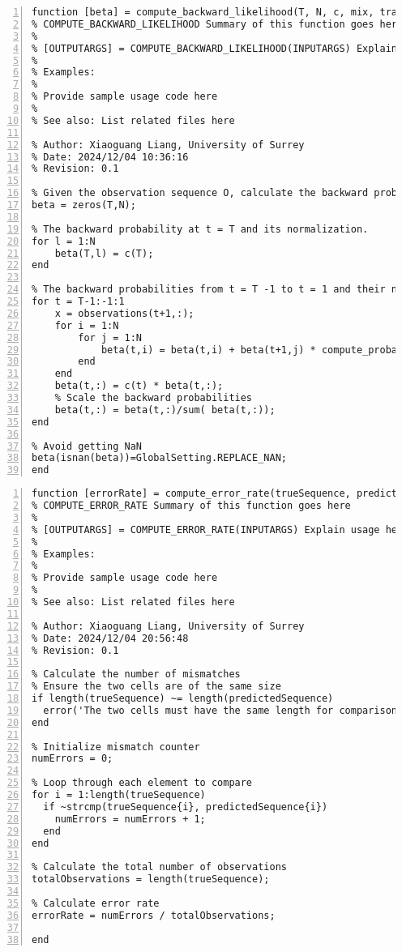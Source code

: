 \documentclass{article}
\begin{document}
\begin{lstlisting}[frame=single, numbers=left, style=Matlab-editor, caption={compute\_backward\_likelihood.m}, label={lst:compute_backward_likelihood}]
  function [beta] = compute_backward_likelihood(T, N, c, mix, trans, observations)
% COMPUTE_BACKWARD_LIKELIHOOD Summary of this function goes here
% 
% [OUTPUTARGS] = COMPUTE_BACKWARD_LIKELIHOOD(INPUTARGS) Explain usage here
% 
% Examples: 
% 
% Provide sample usage code here
% 
% See also: List related files here

% Author: Xiaoguang Liang, University of Surrey 
% Date: 2024/12/04 10:36:16 
% Revision: 0.1 

% Given the observation sequence O, calculate the backward probabilities beta.
beta = zeros(T,N);

% The backward probability at t = T and its normalization.
for l = 1:N
    beta(T,l) = c(T);
end

% The backward probabilities from t = T -1 to t = 1 and their normalization.
for t = T-1:-1:1
    x = observations(t+1,:);
    for i = 1:N
    	for j = 1:N
    		beta(t,i) = beta(t,i) + beta(t+1,j) * compute_probability(mix(j),x) * trans(i,j);
    	end
    end
    beta(t,:) = c(t) * beta(t,:);
    % Scale the backward probabilities
    beta(t,:) = beta(t,:)/sum( beta(t,:));
end

% Avoid getting NaN
beta(isnan(beta))=GlobalSetting.REPLACE_NAN;
end

\end{lstlisting}

\begin{lstlisting}[frame=single, numbers=left, style=Matlab-editor, caption={compute\_error\_rate.m}, label={lst:compute_error_rate}]
  function [errorRate] = compute_error_rate(trueSequence, predictedSequence)
% COMPUTE_ERROR_RATE Summary of this function goes here
% 
% [OUTPUTARGS] = COMPUTE_ERROR_RATE(INPUTARGS) Explain usage here
% 
% Examples: 
% 
% Provide sample usage code here
% 
% See also: List related files here

% Author: Xiaoguang Liang, University of Surrey 
% Date: 2024/12/04 20:56:48 
% Revision: 0.1 

% Calculate the number of mismatches
% Ensure the two cells are of the same size
if length(trueSequence) ~= length(predictedSequence)
  error('The two cells must have the same length for comparison.');
end

% Initialize mismatch counter
numErrors = 0;

% Loop through each element to compare
for i = 1:length(trueSequence)
  if ~strcmp(trueSequence{i}, predictedSequence{i})
    numErrors = numErrors + 1;
  end
end

% Calculate the total number of observations
totalObservations = length(trueSequence);

% Calculate error rate
errorRate = numErrors / totalObservations;

end

\end{lstlisting}
\end{document}
